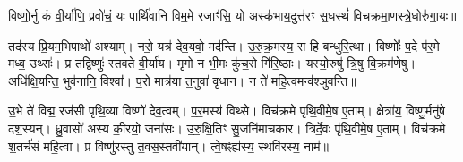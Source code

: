 


विष्णो॒र्नु कं॑ वी॒र्या॑णि॒ प्रवो॑चं॒ यः पार्थि॑वानि विम॒मे रजाꣳ॑सि॒ यो अस्क॑भाय॒दुत्त॑रꣳ स॒धस्थं॑ विचक्रमा॒णस्त्रे॒धोरु॑गा॒यः॥ 

तद॑स्य प्रि॒यम॒भिपाथो॑ अश्याम्। नरो॒ यत्र॑ देव॒यवो॒ मद॑न्ति। उ॒रु॒क्र॒मस्य॒ स हि बन्धु॑रि॒त्था। विष्णोः᳚ प॒दे प॑र॒मे मध्व॒ उथ्सः॑। प्र तद्विष्णुः॑  स्तवते वी॒र्या॑य। मृ॒गो न भी॒मः कु॑च॒रो गि॑रि॒ष्ठाः। यस्यो॒रुषु॑ त्रि॒षु वि॒क्रम॑णेषु। अधि॑क्षि॒यन्ति॒ भुव॑नानि॒ विश्वा᳚। प॒रो मात्र॑या त॒नुवा॑ वृधान। न ते॑ महि॒त्वमन्व॑श्ञुवन्ति॥ 

उ॒भे ते॑ विद्म॒ रज॑सी पृथि॒व्या विष्णो॑ देव॒त्वम्। प॒र॒मस्य॑ विथ्से। विच॑क्रमे पृथि॒वीमे॒ष ए॒ताम्। क्षेत्रा॑य॒ विष्णु॒र्मनु॑षे दश॒स्यन्। ध्रु॒वासो॑ अस्य की॒रयो॒ जना॑सः। उ॒रु॒क्षि॒तिꣳ सु॒जनि॑माचकार। त्रिर्दे॒वः पृ॑थि॒वीमे॒ष ए॒ताम्। विच॑क्रमे श॒तर्च॑सं महि॒त्वा। प्र विष्णु॑रस्तु त॒वस॒स्तवी॑यान्। त्वे॒षꣴह्य॑स्य॒ स्थवि॑रस्य॒ नाम॑॥ 


